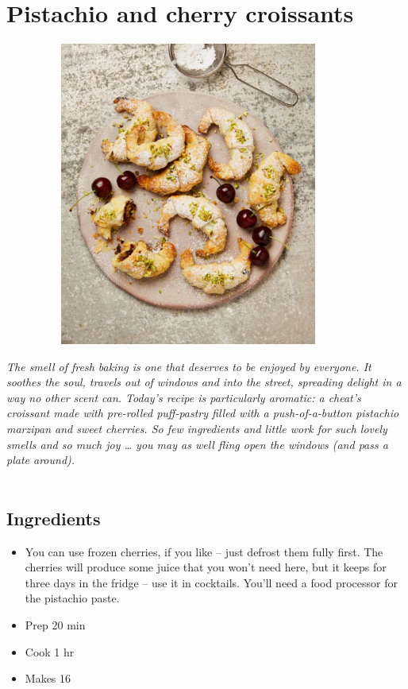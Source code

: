 \documentclass{book}
\begin{document}
\section{Pistachio and cherry croissants}
\begin{figure}
\centering\includegraphics[width=10cm,height=10cm,keepaspectratio]{Recipe_Pictures/Pistachio_and_cherry_croissants.png}
\end{figure}
\emph{The smell of fresh baking is one that deserves to be enjoyed by everyone. It soothes the soul, travels out of windows and into the street, spreading delight in a way no other scent can. Today’s recipe is particularly aromatic: a cheat’s croissant made with pre-rolled puff-pastry filled with a push-of-a-button pistachio marzipan and sweet cherries. So few ingredients and little work for such lovely smells and so much joy … you may as well fling open the windows (and pass a plate around).}\\\\ 
\subsection*{Ingredients}
\begin{itemize}
\item You can use frozen cherries, if you like – just defrost them fully first. The cherries will produce some juice that you won’t need here, but it keeps for three days in the fridge – use it in cocktails. You’ll need a food processor for the pistachio paste.
\end{itemize}

\begin{itemize}
\item Prep 20 min
\item Cook 1 hr
\item Makes 16
\end{itemize}
\end{document}
